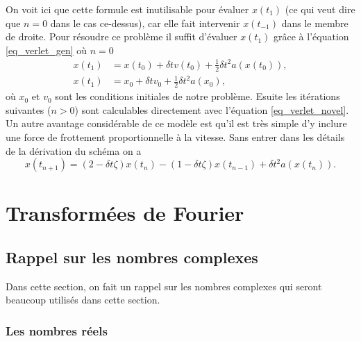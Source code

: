 \documentclass[a4paper,12pt]{book}
\renewcommand{\eqref}[1]{\ref{#1}}
\begin{document}
On voit ici que cette formule est inutilisable pour évaluer $x(t_1)$ (ce qui veut dire que
$n=0$ dans le cas ce-dessus), car elle fait intervenir $x(t_{-1})$ dans le membre de droite.
Pour résoudre ce problème il suffit d'évaluer $x(t_1)$ grâce à l'équation
\eqref{eq_verlet_gen} où $n=0$
\begin{align}
 x(t_{1})&=x(t_0)+\delta t v(t_0)+\frac{1}{2}\delta t^2 a(x(t_0)),\nonumber\\
 x(t_{1})&=x_0+\delta t v_0+\frac{1}{2}\delta t^2 a(x_0),
\end{align}
où $x_0$ et $v_0$ sont les conditions initiales de notre problème.
Esuite les itérations suivantes ($n>0$) sont calculables directement 
avec l'équation \eqref{eq_verlet_novel}. Un autre avantage considérable
de ce modèle est qu'il est très simple d'y inclure une force de frottement
proportionnelle à la vitesse.
Sans entrer dans les détails de la dérivation du schéma on a
\begin{equation}
 x(t_{n+1})=(2-\delta t\zeta)x(t_n)-(1-\delta t\zeta)x(t_{n-1})+\delta t^2 a(x(t_n)).
\end{equation}




\chapter{Transformées de Fourier}

\section{Rappel sur les nombres complexes}

Dans cette section, on fait un rappel sur les nombres complexes qui seront beaucoup utilisés dans cette section.

\subsection{Les nombres réels}
\end{document}
